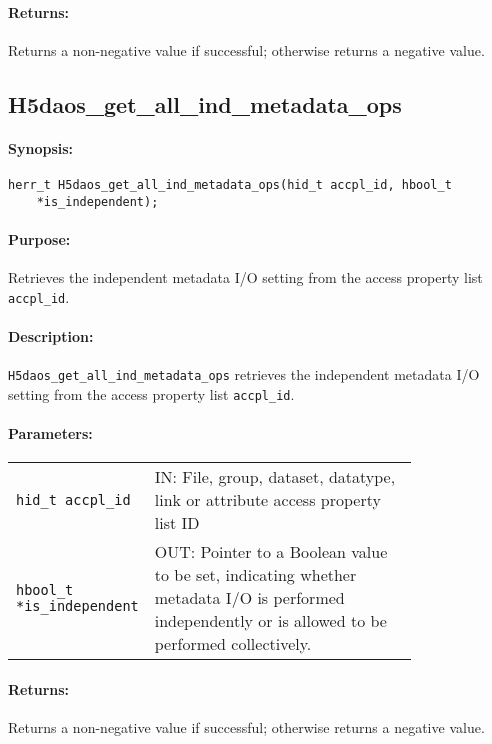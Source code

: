 \documentclass[../users_guide.tex]{subfiles}
\begin{document}
\paragraph{Returns:}
\begin{flushleft}%
Returns a non-negative value if successful; otherwise returns a negative value.
\end{flushleft}%

\newpage
\subsection{H5daos\_get\_all\_ind\_metadata\_ops}
\label{ref:h5daos_get_all_ind_metadata_ops}

\paragraph{Synopsis:}
\begin{flushleft}%
\begin{verbatim}
herr_t H5daos_get_all_ind_metadata_ops(hid_t accpl_id, hbool_t
    *is_independent);
\end{verbatim}
\end{flushleft}%

\paragraph{Purpose:}
\begin{flushleft}%
Retrieves the independent metadata I/O setting from the access property list \texttt{accpl\_id}.
\end{flushleft}%

\paragraph{Description:}
\begin{flushleft}%
\texttt{H5daos\_get\_all\_ind\_metadata\_ops} retrieves the independent metadata I/O setting
from the access property list \texttt{accpl\_id}.
\end{flushleft}%

\paragraph{Parameters:}
\begin{flushleft}%
 \begin{tabular}{lp{0.8\linewidth}}%
   \texttt{hid\_t accpl\_id} & IN: File, group, dataset, datatype, link or attribute access property list ID \\
   \texttt{hbool\_t *is\_independent} & OUT: Pointer to a Boolean value to be set, indicating whether metadata
   I/O is performed independently or is allowed to be performed collectively. \\
 \end{tabular}%
\end{flushleft}%

\paragraph{Returns:}
\begin{flushleft}%
Returns a non-negative value if successful; otherwise returns a negative value.
\end{flushleft}%
\end{document}
